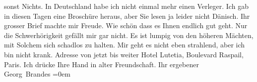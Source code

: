 \begin{ledgroupsized}[t]{13cm}
               sonst Nichts. In Deutschland habe ich nicht
               einmal mehr einen Verleger. Ich gab in diesen Tagen eine Broschüre heraus, aber Sie lesen ja leider
               nicht Dänisch.\pend
           \pstart
           Ihr grosser Brief machte mir Freude. Wie schön dass es Ihnen endlich gut geht. Nur
               die Schwerhörigkeit gefällt mir gar nicht. Es ist lumpig von den höheren Mächten, mit
               Solchem sich schadlos zu halten.\pend
           \pstart
           Mir geht es nicht eben strahlend, aber ich bin nicht krank. Adresse von jetzt bis
               weiter Hotel Lutetia, Boulevard Raspail, Paris.\pend
           \pstart
           Ich drücke Ihre Hand in alter Freundschaft.\pend
           \pstart
           Ihr ergebener{\\[\baselineskip]}\spacefill\mbox{Georg Brandes}\pend
           \leftskip=0em{}
         
         \endnumbering{}\end{ledgroupsized}  \newcommand{\dateiname}{L02016}\newcommand{\titel}{Georg Brandes an Arthur Schnitzler, 11. 4. 1911}\newcommand{\editorInnen}{Martin Anton Müller und Gerd-Hermann Susen}
      